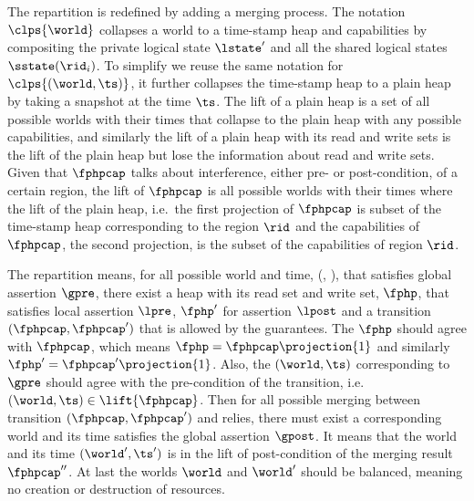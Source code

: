 The repartition is redefined by adding a merging process.
The notation \( \clps{\world} \) collapses a world to a time-stamp heap and capabilities by compositing the private logical state \( \lstate' \) and all the shared logical states \( \sstate(\rid_{i}) \).
To simplify we reuse the same notation for \( \clps{( \world, \ts) } \), it further collapses the time-stamp heap to a plain heap by taking a snapshot at the time \( \ts \).
The lift of a plain heap is a set of all possible worlds with their times that collapse to the plain heap with any possible capabilities, and similarly the lift of a plain heap with its read and write sets is the lift of the plain heap but lose the information about read and write sets.
Given that \( \fphpcap \) talks about interference, either pre- or post-condition, of a certain region, the lift of \( \fphpcap \) is all possible worlds with their times where the lift of the plain heap, i.e.\ the first projection of \( \fphpcap \) is subset of the time-stamp heap corresponding to the region \( \rid \) and the capabilities of \( \fphpcap \), the second projection, is the subset of the capabilities of region \( \rid \).

The repartition means, for all possible world and time, (\world, \ts), that satisfies global assertion \( \gpre \), there exist a heap with its read set and write set, \( \fphp \), that satisfies local assertion \( \lpre \), \( \fphp' \) for assertion \( \lpost \) and a transition \( (\fphpcap, \fphpcap' ) \) that is allowed by the guarantees.
The \( \fphp \) should agree with \( \fphpcap \), which means \( \fphp = \fphpcap\projection{1} \) and similarly \( \fphp' = \fphpcap'\projection{1} \).
Also, the \( (\world, \ts) \) corresponding to \( \gpre \) should agree with the pre-condition of the transition, i.e.\ \( (\world, \ts) \in \lift{\fphpcap} \).
Then for all possible merging between transition \( (\fphpcap, \fphpcap' ) \) and relies, there must exist a corresponding world and its time satisfies the global assertion \( \gpost \).
It means that the world and its time \( (\world', \ts') \) is in the lift of post-condition of the merging result \( \fphpcap'' \).
At last the worlds \( \world \) and \( \world' \) should be balanced, meaning no creation or destruction of resources.


